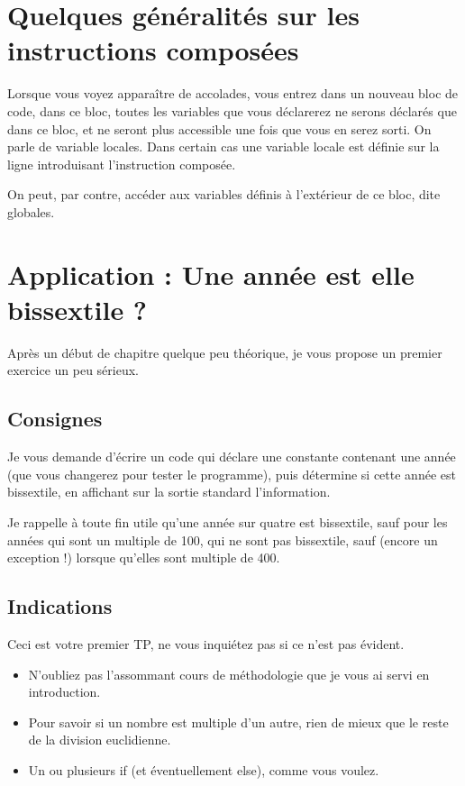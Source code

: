 \section{Quelques généralités sur les instructions composées}
Lorsque vous voyez apparaître de accolades, vous entrez dans un nouveau bloc de code, dans ce bloc, toutes les variables que vous déclarerez ne serons déclarés que dans ce bloc, et ne seront plus accessible une fois que vous en serez sorti. On parle de variable locales. Dans certain cas une variable locale est définie sur la ligne introduisant l'instruction composée.

On peut, par contre, accéder aux variables définis à l'extérieur de ce bloc, dite globales.
\section{Application : Une année est elle bissextile ?}
Après un début de chapitre quelque peu théorique, je vous propose un premier exercice un peu sérieux.
\subsection{Consignes}
Je vous demande d'écrire un code qui déclare une constante contenant une année
(que vous changerez pour tester le programme),
puis détermine si cette année est bissextile,
en affichant sur la sortie standard l'information.

Je rappelle à toute fin utile qu'une année sur quatre est bissextile,
sauf pour les années qui sont un multiple de 100, qui ne sont pas bissextile,
sauf (encore un exception !) lorsque qu'elles sont multiple de 400.
\subsection{Indications}

Ceci est votre premier TP, ne vous inquiétez pas si ce n'est pas évident.

\begin{itemize}

\item N'oubliez pas l'assommant cours de méthodologie que je vous ai servi en introduction.

\item Pour savoir si un nombre est multiple d'un autre,
rien de mieux que le reste de la division euclidienne.

\item Un ou plusieurs if (et éventuellement else), comme vous voulez.
\end{itemize}
\pagebreak %

